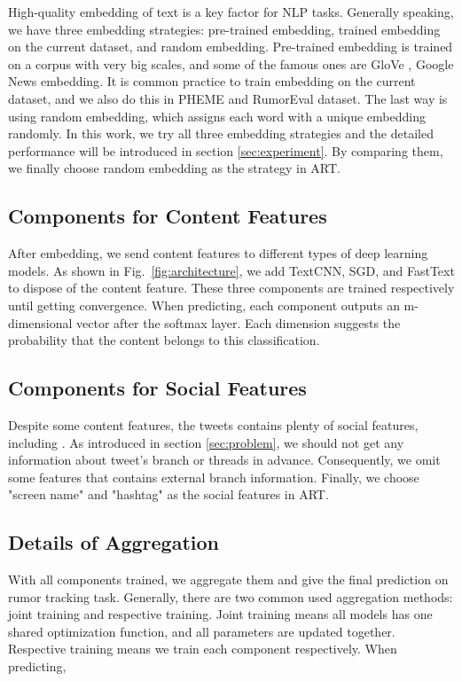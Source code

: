 High-quality embedding of text is a key factor for NLP tasks. Generally speaking, we have three embedding strategies: pre-trained embedding, trained embedding on the current dataset, and random embedding. Pre-trained embedding is trained on a corpus with very big scales, and some of the famous ones are GloVe \cite{pennington2014glove}, Google News embedding\cite{DBLP:journals/corr/abs-1301-3781}. It is common practice to train embedding on the current dataset, and we also do this in PHEME and RumorEval dataset. The last way is using random embedding, which assigns each word with a unique embedding randomly. In this work, we try all three embedding strategies and the detailed performance will be introduced in section \ref{sec:experiment}. By comparing them, we finally choose random embedding as the strategy in ART.

\subsection{Components for Content Features}
After embedding, we send content features to different types of deep learning models. As shown in Fig.~\ref{fig:architecture}, we add TextCNN, SGD, and FastText to dispose of the content feature. These three components are trained respectively until getting convergence. When predicting, each component outputs an m-dimensional vector after the softmax layer. Each dimension suggests the probability that the content belongs to this classification.

\subsection{Components for Social Features}
Despite some content features, the tweets contains plenty of social features, including . As introduced in section \ref{sec:problem}, we should not get any information about tweet's branch or threads in advance. Consequently, we omit some features that contains external branch information. Finally, we choose "screen name" and "hashtag" as the social features in ART. 

\subsection{Details of Aggregation}
With all components trained, we aggregate them and give the final prediction on rumor tracking task. Generally, there are two common used aggregation methods: joint training and respective training. Joint training means all models has one shared optimization function, and all parameters are updated together. Respective training means we train each component respectively. When predicting, 